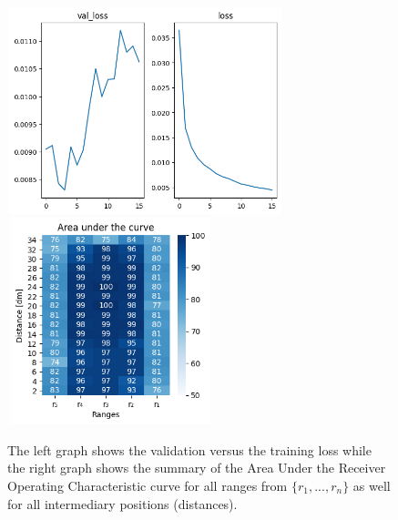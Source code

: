 \begin{multicols}{2}
\begin{itemize}
\end{itemize}
\end{multicols}\begin{figure}[H]%
\centering
\includegraphics[width=8cm,height=6cm]{3_models/models_59/graph_59.png}
\hspace{0.2 cm}
\includegraphics[width=6cm,height=6cm]{4_plots/plots_59/AUC_59.png}
\caption{The left graph shows the validation versus the training loss while the right graph shows the summary of the Area Under the Receiver Operating Characteristic curve for all ranges from $\{r_{1}, ... ,r_{n}\}$ as well for all intermediary positions (distances).}
\label{auc_59}
\end{figure}

\newpage
